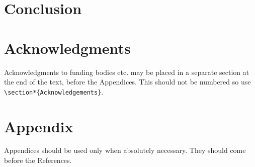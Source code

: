 \documentclass{ws-rv9x6}
\begin{document}
\section{Conclusion}\label{conclusion}

\section{Acknowledgments}
Acknowledgments to funding bodies etc. may be placed in a separate
section at the end of the text, before the Appendices. This should not
be numbered so use \verb|\section*{Acknowledgements}|.

\section{Appendix}
Appendices should be used only when absolutely necessary. They
should come before the References.





\end{document}
